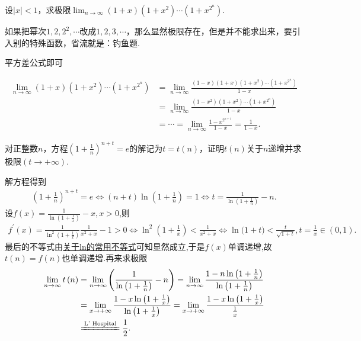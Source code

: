 \documentclass[../../main.tex]{subfiles}%
\begin{document}
\begin{example}
设\(\vert x\vert < 1\)，求极限\(\lim_{n\rightarrow\infty}(1 + x)(1 + x^2)\cdots(1 + x^{2^n})\).
\end{example}
\begin{remark}
如果把幂次\(1,2,2^2,\cdots\)改成\(1,2,3,\cdots\)，那么显然极限存在，但是并不能求出来，要引入别的特殊函数，省流就是：钓鱼题.
\end{remark}
\begin{note}
平方差公式即可
\end{note}
\begin{solution}
\begin{align*}
\lim_{n\rightarrow \infty} (1+x)(1+x^2)\cdots (1+x^{2^n})&=\lim_{n\rightarrow \infty} \frac{(1-x)(1+x)(1+x^2)\cdots (1+x^{2^n})}{1-x}
\\
&=\lim_{n\rightarrow \infty} \frac{(1-x^2)(1+x^2)\cdots (1+x^{2^n})}{1-x}\\
&=\cdots =\lim_{n\rightarrow \infty} \frac{1-x^{2^{n+1}}}{1-x}=\frac{1}{1-x}.
\end{align*}
\end{solution}

\begin{example}
对正整数\(n\)，方程\(\left(1 + \frac{1}{n}\right)^{n + t}=e\)的解记为\(t = t(n)\)，证明\(t(n)\)关于\(n\)递增并求极限\((t\to +\infty)\).
\end{example}
\begin{solution}
解方程得到
\begin{align*}
\left(1 + \frac{1}{n}\right)^{n + t}=e\Leftrightarrow(n + t)\ln\left(1 + \frac{1}{n}\right)=1\Leftrightarrow t=\frac{1}{\ln\left(1 + \frac{1}{n}\right)}-n.
\end{align*}
设$f(x)=\frac{1}{\ln\left(1 + \frac{1}{x}\right)}-x,x>0$,则
\begin{align*}
f^\prime(x)=\frac{1}{\ln^{2}\left(1 + \frac{1}{x}\right)}\frac{1}{x^{2}+x}-1>0
\Leftrightarrow\ln^{2}\left(1 + \frac{1}{x}\right)<\frac{1}{x^{2}+x}\Leftrightarrow\ln\mathrm{(}1+t)<\frac{t}{\sqrt{1+t}},t=\frac{1}{x}\in \left( 0,1 \right) .
\end{align*}
最后的不等式由\hyperref[proposition:指数对数函数不等式1]{关于ln的常用不等式}可知显然成立,于是$f(x)$单调递增,故$t(n)=f(n)$也单调递增.再来求极限
\begin{align*}
\lim_{n\rightarrow \infty} t\left( n \right) &=\lim_{n\rightarrow \infty} \left( \frac{1}{\ln \left( 1+\frac{1}{n} \right)}-n \right) =\lim_{n\rightarrow \infty} \frac{1-n\ln \left( 1+\frac{1}{n} \right)}{\ln \left( 1+\frac{1}{n} \right)}
\\
&=\lim_{x\rightarrow +\infty} \frac{1-x\ln \left( 1+\frac{1}{x} \right)}{\ln \left( 1+\frac{1}{x} \right)}=\lim_{x\rightarrow +\infty} \frac{1-x\ln \left( 1+\frac{1}{x} \right)}{\frac{1}{x}}
\\
&\xlongequal{\text{L' Hospital}}\frac{1}{2}.
\end{align*}
\end{solution}
\end{document}
